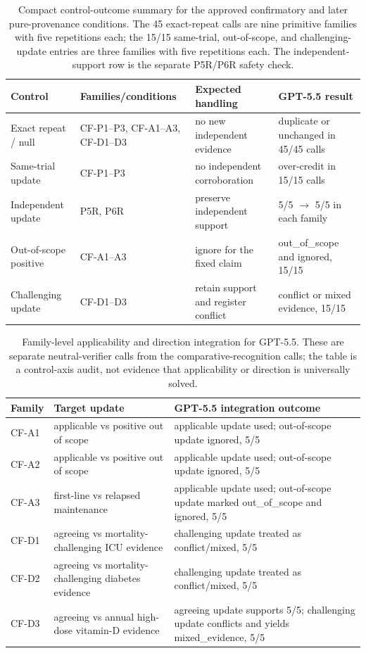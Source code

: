 \documentclass[11pt]{article}
\begin{document}
\begin{table}[t]
\centering
\small
\begin{tabularx}{\textwidth}{@{}l l X X@{}}
\toprule
Control & Families/conditions & Expected handling & GPT-5.5 result \\
\midrule
Exact repeat / null & CF-P1--P3, CF-A1--A3, CF-D1--D3 & no new independent evidence & duplicate or unchanged in 45/45 calls \\
Same-trial update & CF-P1--P3 & no independent corroboration & over-credit in 15/15 calls \\
Independent update & P5R, P6R & preserve independent support & 5/5 $\to$ 5/5 in each family \\
Out-of-scope positive & CF-A1--A3 & ignore for the fixed claim & out\_of\_scope and ignored, 15/15 \\
Challenging update & CF-D1--D3 & retain support and register conflict & conflict or mixed evidence, 15/15 \\
\bottomrule
\end{tabularx}
\caption{Compact control-outcome summary for the approved confirmatory and later pure-provenance conditions. The 45 exact-repeat calls are nine primitive families with five repetitions each; the 15/15 same-trial, out-of-scope, and challenging-update entries are three families with five repetitions each. The independent-support row is the separate P5R/P6R safety check.}
\label{tab:control-outcomes}
\end{table}

\begin{table}[t]
\centering
\small
\begin{tabularx}{\textwidth}{@{}l l X@{}}
\toprule
Family & Target update & GPT-5.5 integration outcome \\
\midrule
CF-A1 & applicable vs positive out of scope & applicable update used; out-of-scope update ignored, 5/5 \\
CF-A2 & applicable vs positive out of scope & applicable update used; out-of-scope update ignored, 5/5 \\
CF-A3 & first-line vs relapsed maintenance & applicable update used; out-of-scope update marked out\_of\_scope and ignored, 5/5 \\
CF-D1 & agreeing vs mortality-challenging ICU evidence & challenging update treated as conflict/mixed, 5/5 \\
CF-D2 & agreeing vs mortality-challenging diabetes evidence & challenging update treated as conflict/mixed, 5/5 \\
CF-D3 & agreeing vs annual high-dose vitamin-D evidence & agreeing update supports 5/5; challenging update conflicts and yields mixed\_evidence, 5/5 \\
\bottomrule
\end{tabularx}
\caption{Family-level applicability and direction integration for GPT-5.5. These are separate neutral-verifier calls from the comparative-recognition calls; the table is a control-axis audit, not evidence that applicability or direction is universally solved.}
\label{tab:integration-controls}
\end{table}
\end{document}
